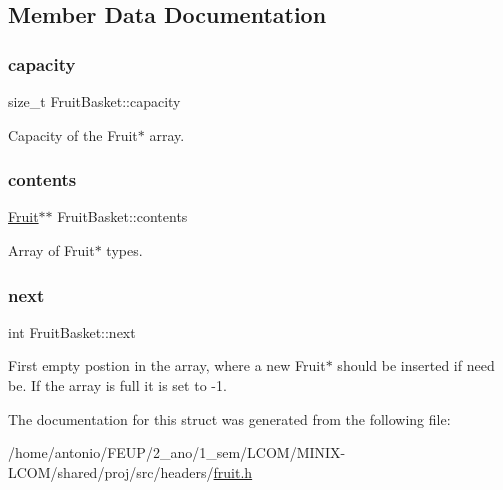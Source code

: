 \subsection{Member Data Documentation}
\mbox{\label{structFruitBasket_abcf02dddf09fc857940ec2ec6a101400}} 
\subsubsection{\texorpdfstring{capacity}{capacity}}
{\footnotesize\ttfamily size\+\_\+t Fruit\+Basket\+::capacity}

Capacity of the Fruit$\ast$ array. \mbox{\label{structFruitBasket_ae5641a1a4ed91bdc01b4aaf5b263b2b1}} 
\subsubsection{\texorpdfstring{contents}{contents}}
{\footnotesize\ttfamily \hyperlink{structFruit}{Fruit}$\ast$$\ast$ Fruit\+Basket\+::contents}

Array of Fruit$\ast$ types. \mbox{\label{structFruitBasket_a752bfa7c141af1434ddb78ce754e8db6}} 
\subsubsection{\texorpdfstring{next}{next}}
{\footnotesize\ttfamily int Fruit\+Basket\+::next}

First empty postion in the array, where a new Fruit$\ast$ should be inserted if need be. If the array is full it is set to -\/1. 

The documentation for this struct was generated from the following file\+:\begin{DoxyCompactItemize}
\item 
/home/antonio/\+F\+E\+U\+P/2\+\_\+ano/1\+\_\+sem/\+L\+C\+O\+M/\+M\+I\+N\+I\+X-\/\+L\+C\+O\+M/shared/proj/src/headers/\hyperlink{fruit_8h}{fruit.\+h}\end{DoxyCompactItemize}
